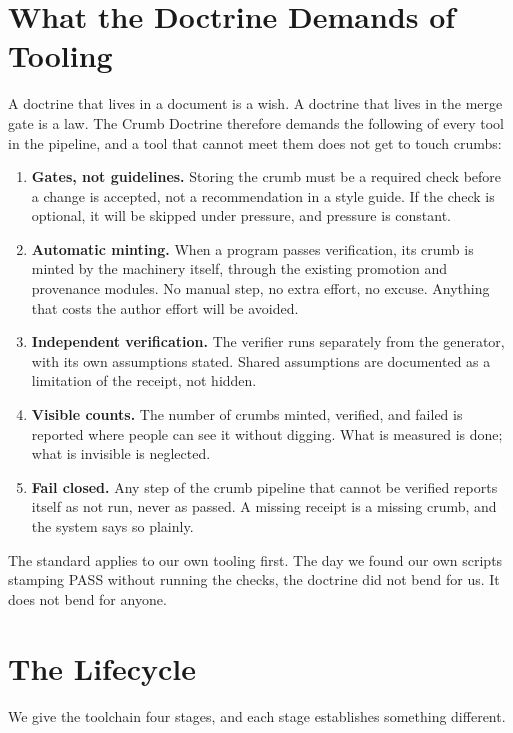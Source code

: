 \documentclass[11pt]{article}
\begin{document}
\section{What the Doctrine Demands of Tooling}

A doctrine that lives in a document is a wish. A doctrine that lives in the merge gate is a law. The Crumb Doctrine therefore demands the following of every tool in the pipeline, and a tool that cannot meet them does not get to touch crumbs:

\begin{enumerate}[leftmargin=*]
\item \textbf{Gates, not guidelines.} Storing the crumb must be a required check before a change is accepted, not a recommendation in a style guide. If the check is optional, it will be skipped under pressure, and pressure is constant.
\item \textbf{Automatic minting.} When a program passes verification, its crumb is minted by the machinery itself, through the existing promotion and provenance modules. No manual step, no extra effort, no excuse. Anything that costs the author effort will be avoided.
\item \textbf{Independent verification.} The verifier runs separately from the generator, with its own assumptions stated. Shared assumptions are documented as a limitation of the receipt, not hidden.
\item \textbf{Visible counts.} The number of crumbs minted, verified, and failed is reported where people can see it without digging. What is measured is done; what is invisible is neglected.
\item \textbf{Fail closed.} Any step of the crumb pipeline that cannot be verified reports itself as not run, never as passed. A missing receipt is a missing crumb, and the system says so plainly.
\end{enumerate}

The standard applies to our own tooling first. The day we found our own scripts stamping PASS without running the checks, the doctrine did not bend for us. It does not bend for anyone.

\section{The Lifecycle}

We give the toolchain four stages, and each stage establishes something different.
\end{document}
